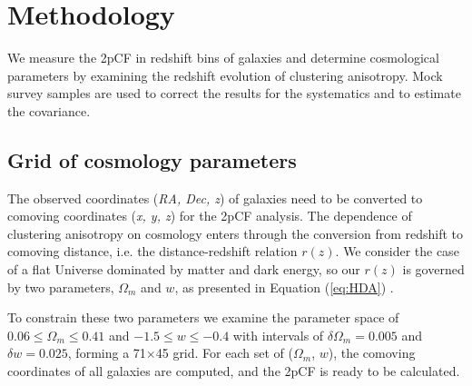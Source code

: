 \documentclass[iop]{emulateapj}
\begin{document}
\section{Methodology}\label{sec:methodology}

We measure the 2pCF in redshift bins of galaxies and 
determine cosmological parameters by examining the redshift evolution of clustering anisotropy.
Mock survey samples are used to correct the results for the systematics and to estimate the covariance.

\subsection{Grid of cosmology parameters}

The observed coordinates ({\it RA, Dec, z}) of galaxies
need to be converted to comoving coordinates ({\it x, y, z}) for the 2pCF analysis.
The dependence of clustering anisotropy on cosmology enters through the conversion from redshift to comoving distance,
i.e. the distance-redshift relation $r(z)$.
We consider the case of a flat Universe dominated by matter and dark energy,
so our $r(z)$ is governed by two parameters, $\Omega_m$ and $w$, as presented in Equation (\ref{eq:HDA})	.

To constrain these two parameters we examine the parameter space of 
$0.06\leq \Omega_m\leq 0.41$ and $-1.5 \leq w \leq -0.4$ with intervals of 
$\delta \Omega_m = 0.005$ and $\delta w = 0.025$,
forming a 71$\times$45 grid.
For each set of ($\Omega_m$, $w$), 
the comoving coordinates of all galaxies are computed, 
and the 2pCF is ready to be calculated.
\end{document}
